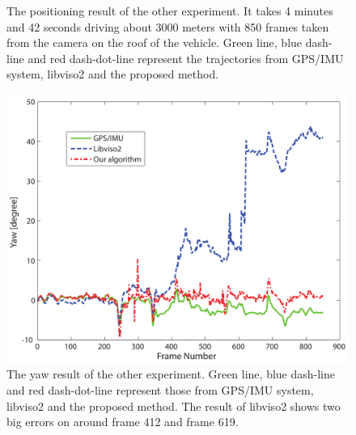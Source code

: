 \documentclass[letterpaper, 10 pt, conference]{ieeeconf}  %
\begin{document}
\begin{figure}[t]
\begin{minipage}[t]{0.48\linewidth}
    \label{fig:another_T_result}
  \end{minipage}%
\caption{The positioning result of the other experiment. It takes 4 minutes and 42 seconds driving about 3000 meters with 850 frames taken from the camera on the roof of the vehicle. Green line, blue dash-line and red dash-dot-line represent the trajectories from GPS/IMU system, libviso2 and the proposed method.}
\label{fig:another_result}
\end{figure}

\begin{figure}[t]
\centering
\includegraphics[width=0.9\linewidth]{source//Final//R_result_Frame200_1049.pdf}
\caption{The yaw result of the other experiment. Green line, blue dash-line and red dash-dot-line represent those from GPS/IMU system, libviso2 and the proposed method. The result of libviso2 shows two big errors on around frame 412 and frame 619.}
\label{fig:another_rotation_result}
\end{figure}
\end{document}
